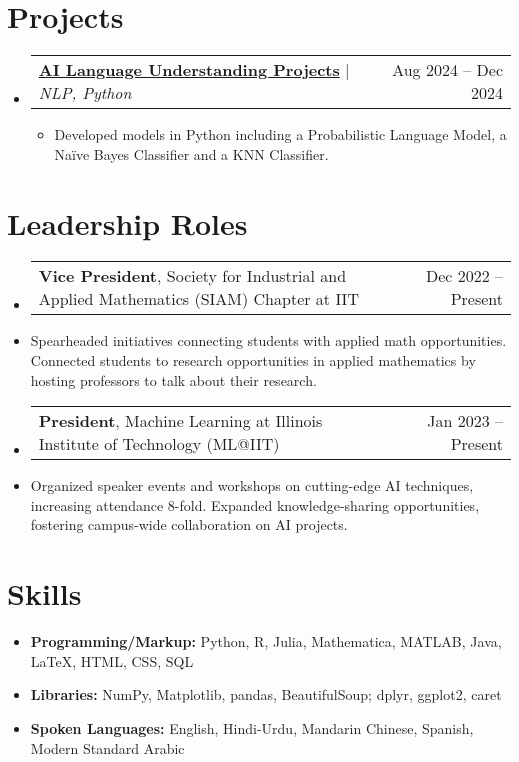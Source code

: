 \documentclass[letterpaper,10pt]{article}
\makeatletter
\newcommand\indentsize{10pt}
\newcommand{\resumeItem}[1]{
  \item\small{
    {#1 \vspace{-2pt}}
  }
}
\newcommand{\resumeSubSubheading}[2]{
    \item \normalsize
    \begin{tabular*}{0.97\textwidth}{l@{\extracolsep{\fill}}r}
      #1 & #2 \\
    \end{tabular*}\vspace{-7pt}
}
\newcommand{\resumeSubHeadingListStart}{\begin{itemize}[leftmargin=0.15in, label=]}
\newcommand{\resumeSubHeadingListEnd}{\end{itemize}}
\newcommand{\resumeItemListStart}{\begin{itemize}[leftmargin=\indentsize, label=-]\vspace{-7pt}}
\newcommand{\resumeItemListEnd}{\end{itemize}\vspace{-5pt}}
\makeatother
\begin{document}
\newcommand{\resumeProjectHeading}[2]{
    \item \normalsize
    \begin{tabular*}{0.97\textwidth}{l@{\extracolsep{\fill}}r}
        #1 & \small#2 \\
    \end{tabular*}
}

\section{Projects}
\resumeSubHeadingListStart
    \resumeProjectHeading{\href{https://github.com/igoeldc/AI-Language-Understanding-Projects}{\textbf{AI Language Understanding Projects}} $|$ \emph{NLP, Python}}{Aug 2024 -- Dec 2024}
        \resumeItemListStart
            \resumeItem{Developed models in Python including a Probabilistic Language Model, a Na\"{i}ve Bayes Classifier and a KNN Classifier.}
        \resumeItemListEnd
\resumeSubHeadingListEnd


\section{Leadership Roles}
\resumeSubHeadingListStart
    \resumeSubSubheading{\textbf{Vice President}, Society for Industrial and Applied Mathematics (SIAM) Chapter at IIT}{Dec 2022 -- Present}
    \resumeItem{Spearheaded initiatives connecting students with applied math opportunities. Connected students to research opportunities in applied mathematics by hosting professors to talk about their research.}
    \resumeSubSubheading{\textbf{President}, Machine Learning at Illinois Institute of Technology (ML@IIT)}{Jan 2023 -- Present}
    \resumeItem{Organized speaker events and workshops on cutting-edge AI techniques, increasing attendance 8-fold. Expanded knowledge-sharing opportunities, fostering campus-wide collaboration on AI projects.}
\resumeSubHeadingListEnd


\section{Skills}
\small
\begin{itemize}[leftmargin=0.15in, label={}]
    \item \textbf{Programming/Markup:} Python, R, Julia, Mathematica, MATLAB, Java, \LaTeX, HTML, CSS, SQL
    \item \vspace{-2pt} \textbf{Libraries:} NumPy, Matplotlib, pandas, BeautifulSoup; dplyr, ggplot2, caret
    \item \vspace{-2pt} \textbf{Spoken Languages:} English, Hindi-Urdu, Mandarin Chinese, Spanish, Modern Standard Arabic
\end{itemize}
\end{document}
